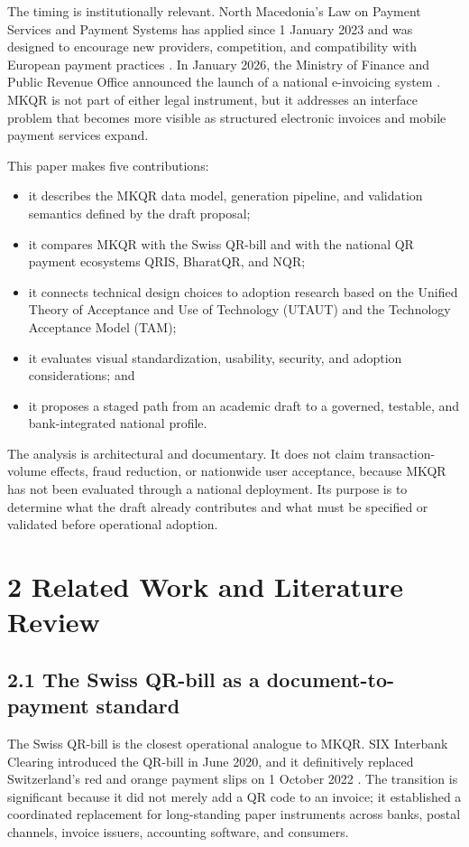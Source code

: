 The timing is institutionally relevant. North Macedonia's Law on Payment Services and Payment Systems has applied since 1 January 2023 and was designed to encourage new providers, competition, and compatibility with European payment practices \cite{mofpayments}. In January 2026, the Ministry of Finance and Public Revenue Office announced the launch of a national e-invoicing system \cite{mofeinvoice}. MKQR is not part of either legal instrument, but it addresses an interface problem that becomes more visible as structured electronic invoices and mobile payment services expand.

This paper makes five contributions:

\begin{itemize}
\item it describes the MKQR data model, generation pipeline, and validation semantics defined by the draft proposal;
\item it compares MKQR with the Swiss QR-bill and with the national QR payment ecosystems QRIS, BharatQR, and NQR;
\item it connects technical design choices to adoption research based on the Unified Theory of Acceptance and Use of Technology (UTAUT) and the Technology Acceptance Model (TAM);
\item it evaluates visual standardization, usability, security, and adoption considerations; and
\item it proposes a staged path from an academic draft to a governed, testable, and bank-integrated national profile.
\end{itemize}

The analysis is architectural and documentary. It does not claim transaction-volume effects, fraud reduction, or nationwide user acceptance, because MKQR has not been evaluated through a national deployment. Its purpose is to determine what the draft already contributes and what must be specified or validated before operational adoption.

\section{2 Related Work and Literature Review}

\subsection{2.1 The Swiss QR-bill as a document-to-payment standard}

The Swiss QR-bill is the closest operational analogue to MKQR. SIX Interbank Clearing introduced the QR-bill in June 2020, and it definitively replaced Switzerland's red and orange payment slips on 1 October 2022 \cite{sixoverview}. The transition is significant because it did not merely add a QR code to an invoice; it established a coordinated replacement for long-standing paper instruments across banks, postal channels, invoice issuers, accounting software, and consumers.

